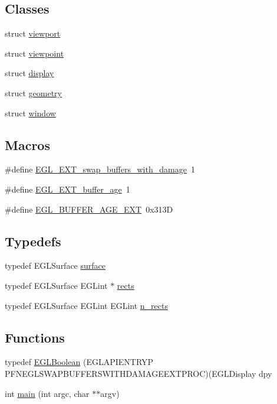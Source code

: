 \subsection*{Classes}
\begin{DoxyCompactItemize}
\item 
struct \hyperlink{structviewport}{viewport}
\item 
struct \hyperlink{structviewpoint}{viewpoint}
\item 
struct \hyperlink{structdisplay}{display}
\item 
struct \hyperlink{structgeometry}{geometry}
\item 
struct \hyperlink{structwindow}{window}
\end{DoxyCompactItemize}
\subsection*{Macros}
\begin{DoxyCompactItemize}
\item 
\#define \hyperlink{simple-egl_8c_a083d37f289b99270e0391419178d458f}{E\-G\-L\-\_\-\-E\-X\-T\-\_\-swap\-\_\-buffers\-\_\-with\-\_\-damage}~1
\item 
\#define \hyperlink{simple-egl_8c_a0792e3d8b2bc978f95917a234b0c81df}{E\-G\-L\-\_\-\-E\-X\-T\-\_\-buffer\-\_\-age}~1
\item 
\#define \hyperlink{simple-egl_8c_a7045d8a6b4857f268a62fab2de2021fd}{E\-G\-L\-\_\-\-B\-U\-F\-F\-E\-R\-\_\-\-A\-G\-E\-\_\-\-E\-X\-T}~0x313\-D
\end{DoxyCompactItemize}
\subsection*{Typedefs}
\begin{DoxyCompactItemize}
\item 
typedef E\-G\-L\-Surface \hyperlink{simple-egl_8c_a0720952aa1caded45b5bcdce589663a9}{surface}
\item 
typedef E\-G\-L\-Surface E\-G\-Lint $\ast$ \hyperlink{simple-egl_8c_a56616f7ca3fc53c0da41d05de9330b11}{rects}
\item 
typedef E\-G\-L\-Surface E\-G\-Lint E\-G\-Lint \hyperlink{simple-egl_8c_aa6a11810244355f89e6c4961b9dd3b53}{n\-\_\-rects}
\end{DoxyCompactItemize}
\subsection*{Functions}
\begin{DoxyCompactItemize}
\item 
typedef \hyperlink{simple-egl_8c_ab4ad070d3bf82abe5e70330578f67893}{E\-G\-L\-Boolean} (E\-G\-L\-A\-P\-I\-E\-N\-T\-R\-Y\-P P\-F\-N\-E\-G\-L\-S\-W\-A\-P\-B\-U\-F\-F\-E\-R\-S\-W\-I\-T\-H\-D\-A\-M\-A\-G\-E\-E\-X\-T\-P\-R\-O\-C)(E\-G\-L\-Display dpy
\item 
int \hyperlink{simple-egl_8c_a3c04138a5bfe5d72780bb7e82a18e627}{main} (int argc, char $\ast$$\ast$argv)
\end{DoxyCompactItemize}
